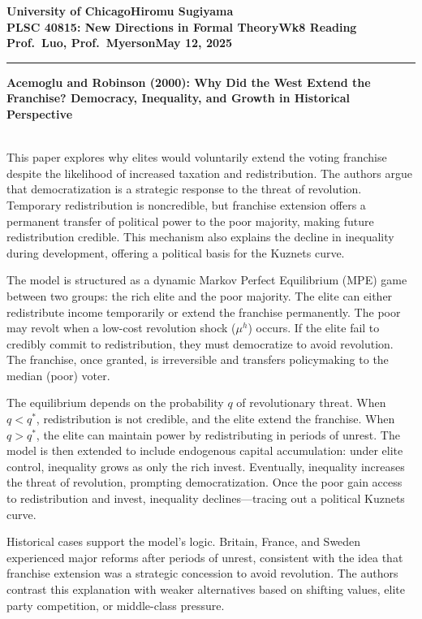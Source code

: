 \documentclass[10pt]{article}    %
\newcommand{\myname}{Hiromu Sugiyama}
\newcommand{\assignment}{Wk8 Reading}
\newcommand{\duedate}{May 12, 2025}
\begin{document}
\textbf{University of Chicago}\hfill\textbf{\myname}\\[0.01in]
\textbf{PLSC 40815: New Directions in Formal Theory}\hfill\textbf{\assignment}\\[0.01in]
\textbf{Prof.\ Luo, Prof.\ Myerson}\hfill\textbf{\duedate}\\
\smallskip\hrule\bigskip

\textbf{Acemoglu and Robinson (2000): Why Did the West Extend the Franchise? Democracy, Inequality, and Growth in Historical Perspective} \par
\\
This paper explores why elites would voluntarily extend the voting franchise despite the likelihood of increased taxation and redistribution. The authors argue that democratization is a strategic response to the threat of revolution. Temporary redistribution is noncredible, but franchise extension offers a permanent transfer of political power to the poor majority, making future redistribution credible. This mechanism also explains the decline in inequality during development, offering a political basis for the Kuznets curve.

The model is structured as a dynamic Markov Perfect Equilibrium (MPE) game between two groups: the rich elite and the poor majority. The elite can either redistribute income temporarily or extend the franchise permanently. The poor may revolt when a low-cost revolution shock (\( \mu^h \)) occurs. If the elite fail to credibly commit to redistribution, they must democratize to avoid revolution. The franchise, once granted, is irreversible and transfers policymaking to the median (poor) voter.

The equilibrium depends on the probability \( q \) of revolutionary threat. When \( q < q^* \), redistribution is not credible, and the elite extend the franchise. When \( q > q^* \), the elite can maintain power by redistributing in periods of unrest. The model is then extended to include endogenous capital accumulation: under elite control, inequality grows as only the rich invest. Eventually, inequality increases the threat of revolution, prompting democratization. Once the poor gain access to redistribution and invest, inequality declines—tracing out a political Kuznets curve.

Historical cases support the model’s logic. Britain, France, and Sweden experienced major reforms after periods of unrest, consistent with the idea that franchise extension was a strategic concession to avoid revolution. The authors contrast this explanation with weaker alternatives based on shifting values, elite party competition, or middle-class pressure.
\end{document}
